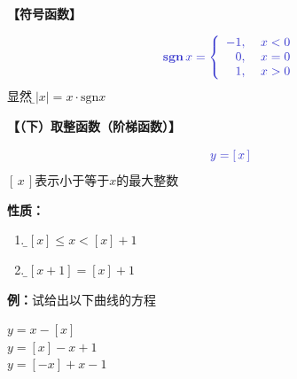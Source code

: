 {\bf 【符号函数】}

  $${\b \bm{\mathrm{sgn}}\,x =\left\{
	\begin{array}{rl}
	-1,\;&x<0 \\
	0,\;&x=0 \\
	1,\;&x>0
	\end{array}
  \right.}$$
显然，{\b $|x|=x \cdot\mathrm{sgn} x$}
	
{\bf 【（下）取整函数（阶梯函数）】}

  $${\b y=\left[ \,x\, \right]}$$
  $[\,x\,]$表示小于等于$x$的最大整数

{\bf 性质：}
\begin{enumerate}[(1)]
  \setlength{\itemindent}{1cm}
  \item {\b $[x]\leq x<[x]+1$}
  \item {\b $[x+1]=[x]+1$}
\end{enumerate}

{\bf 例：}试给出以下曲线的方程

\begin{center}
	\quad $y=x-[x]$\\

	\quad $y=[x]-x+1$\\

	\quad $y=[-x]+x-1$
\end{center}
	
